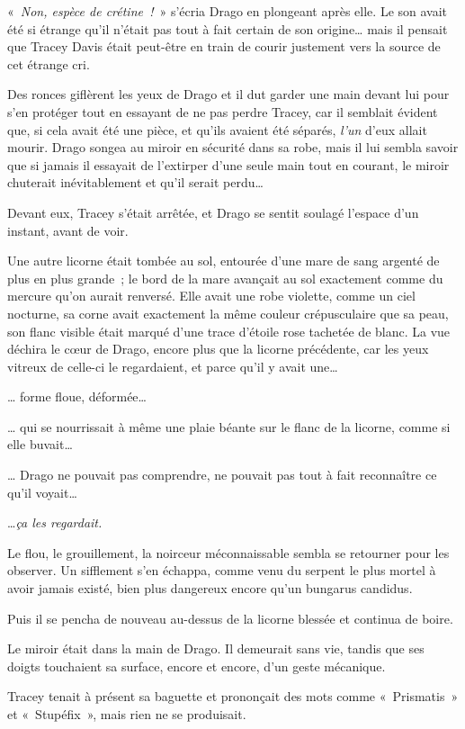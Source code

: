 «~\emph{Non, espèce de crétine~!}~» s'écria Drago en plongeant après elle. Le son avait été si étrange qu'il n'était pas tout à fait certain de son origine… mais il pensait que Tracey Davis était peut-être en train de courir justement vers la source de cet étrange cri.

Des ronces giflèrent les yeux de Drago et il dut garder une main devant lui pour s'en protéger tout en essayant de ne pas perdre Tracey, car il semblait évident que, si cela avait été une pièce, et qu'ils avaient été séparés, \emph{l'un} d'eux allait mourir. Drago songea au miroir en sécurité dans sa robe, mais il lui sembla savoir que si jamais il essayait de l'extirper d'une seule main tout en courant, le miroir chuterait inévitablement et qu'il serait perdu…

Devant eux, Tracey s'était arrêtée, et Drago se sentit soulagé l'espace d'un instant, avant de voir.

Une autre licorne était tombée au sol, entourée d'une mare de sang argenté de plus en plus grande~; le bord de la mare avançait au sol exactement comme du mercure qu'on aurait renversé. Elle avait une robe violette, comme un ciel nocturne, sa corne avait exactement la même couleur crépusculaire que sa peau, son flanc visible était marqué d'une trace d'étoile rose tachetée de blanc. La vue déchira le cœur de Drago, encore plus que la licorne précédente, car les yeux vitreux de celle-ci le regardaient, et parce qu'il y avait une…

… forme floue, déformée…

… qui se nourrissait à même une plaie béante sur le flanc de la licorne, comme si elle buvait…

… Drago ne pouvait pas comprendre, ne pouvait pas tout à fait reconnaître ce qu'il voyait…

…\emph{ça les regardait.}

Le flou, le grouillement, la noirceur méconnaissable sembla se retourner pour les observer. Un sifflement s'en échappa, comme venu du serpent le plus mortel à avoir jamais existé, bien plus dangereux encore qu'un bungarus candidus.

Puis il se pencha de nouveau au-dessus de la licorne blessée et continua de boire.

Le miroir était dans la main de Drago. Il demeurait sans vie, tandis que ses doigts touchaient sa surface, encore et encore, d'un geste mécanique.

Tracey tenait à présent sa baguette et prononçait des mots comme «~Prismatis~» et «~Stupéfix~», mais rien ne se produisait.


